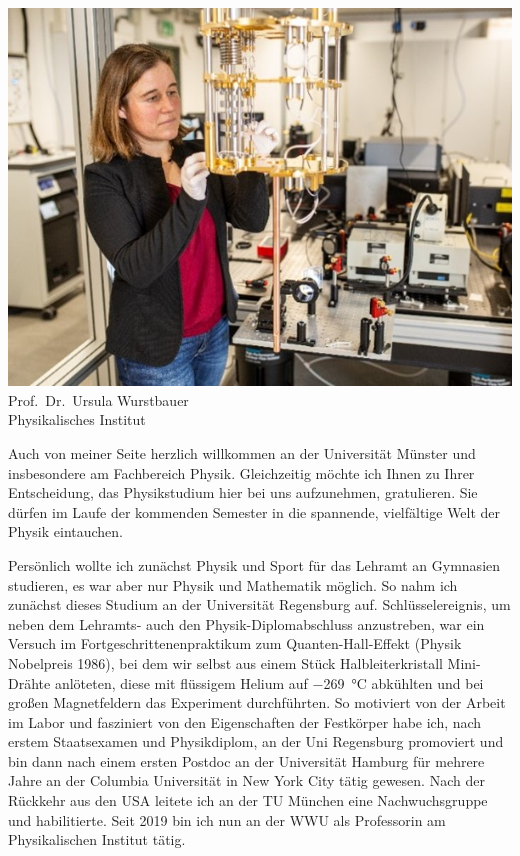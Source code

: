 \begin{multicols}{2}
\begin{center}
\includegraphics[width=0.8\columnwidth]{res/vorstellungsfotos/wurstbauer.jpg}\\
\smallskip
Prof.\ Dr.\ Ursula Wurstbauer\\
Physikalisches Institut
\end{center}

Auch von meiner Seite herzlich willkommen an der Universität Münster und insbesondere am Fachbereich Physik. Gleichzeitig möchte ich Ihnen zu Ihrer Entscheidung, das Physikstudium hier bei uns aufzunehmen, gratulieren. Sie dürfen im Laufe der kommenden Semester in die spannende, vielfältige Welt der Physik eintauchen.

Persönlich wollte ich zunächst Physik und Sport für das Lehramt an Gymnasien studieren, es war aber nur Physik und Mathematik möglich. So nahm ich zunächst dieses Studium an der Universität Regensburg auf. Schlüsselereignis, um neben dem Lehramts- auch den Physik-Diplomabschluss anzustreben, war ein Versuch im Fortgeschrittenenpraktikum zum Quanten-Hall-Effekt (Physik Nobelpreis 1986), bei dem wir selbst aus einem Stück Halbleiterkristall Mini-Drähte anlöteten, diese mit flüssigem Helium auf \SI{-269}{\celsius} abkühlten und bei großen Magnetfeldern das Experiment durchführten. So motiviert von der Arbeit im Labor und fasziniert von den Eigenschaften der Festkörper habe ich, nach erstem Staatsexamen und Physikdiplom, an der Uni Regensburg promoviert und bin dann nach einem ersten Postdoc an der Universität Hamburg für mehrere Jahre an der Columbia Universität in New York City tätig gewesen. Nach der Rückkehr aus den USA leitete ich an der TU München eine Nachwuchsgruppe und habilitierte. Seit 2019 bin ich nun an der WWU als Professorin am Physikalischen Institut tätig. 


\end{multicols}
